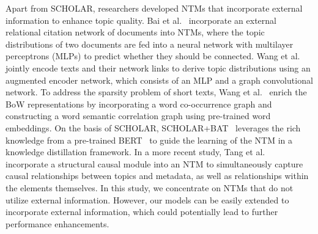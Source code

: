 Apart from SCHOLAR, researchers developed NTMs that incorporate external information to enhance topic quality.
Bai et al.~\cite{bai2018neural} incorporate an external relational citation network of documents into NTMs, where the topic distributions of two documents are fed into a neural network with multilayer perceptrons (MLPs) to predict whether they should be connected.
Wang et al.~\cite{wang2021layer} jointly encode texts and their network links to derive topic distributions using an augmented encoder network, which consists of an MLP and a graph convolutional network.
To address the sparsity problem of short texts, Wang et al.~\cite{wang2021extracting} enrich the BoW representations by incorporating a word co-occurrence graph and constructing a word semantic correlation graph using pre-trained word embeddings.
On the basis of SCHOLAR, SCHOLAR+BAT~\cite{hoyle2020improving} leverages the rich knowledge from a pre-trained BERT~\cite{devlin2019bert} to guide the learning of the NTM in a knowledge distillation framework.
In a more recent study, Tang et al.~\cite{tang2024beyond} incorporate a structural causal module into an NTM to simultaneously capture causal relationships between topics and metadata, as well as relationships within the elements themselves.
In this study, we concentrate on NTMs that do not utilize external information. 
However, our models can be easily extended to incorporate external information, which could potentially lead to further performance enhancements.

